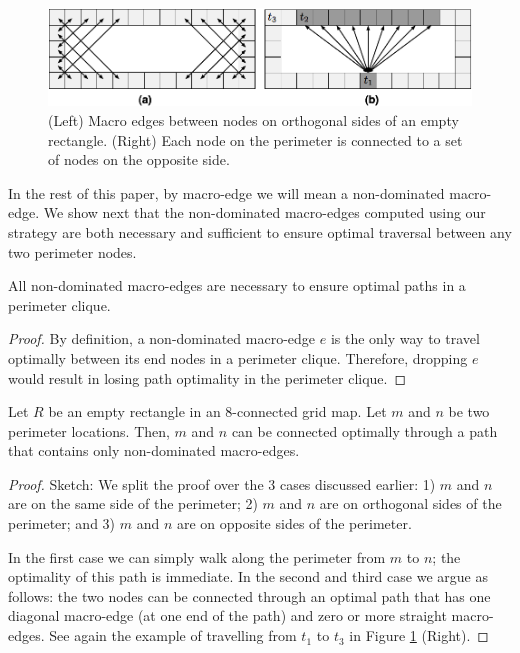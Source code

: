 \begin{figure}[tb]
       \begin{center}
		   \includegraphics[width=0.97\columnwidth, trim = 10mm 10mm 10mm 0mm]
			{diagrams/macroedges_wide.png}
       \end{center}
	\vspace{-3pt}
       \caption{(Left) Macro edges between nodes on orthogonal sides of an empty
       rectangle. (Right) Each node on the perimeter is connected to a set of 
		nodes on the opposite side.}
       \label{fig-macroedges}
\end{figure}

In the rest of this paper, by macro-edge we will mean a non-dominated macro-edge.
We show next that the non-dominated macro-edges computed using our strategy are both
necessary and sufficient to ensure optimal traversal between any two perimeter
nodes.

\begin{proposition} All non-dominated macro-edges are necessary to ensure
optimal paths in a perimeter clique.  
\end{proposition} 
\begin{proof} By
definition, a non-dominated macro-edge $e$ is the only way to travel optimally
between its end nodes in a perimeter clique. Therefore, dropping $e$ would
result in losing path optimality in the perimeter clique.  
\end{proof}

\begin{lemma} \label{lemma-rooms} Let $R$ be an empty rectangle in
an 8-connected grid map. Let $m$ and $n$ be two perimeter locations.
Then, $m$ and $n$ can be connected optimally through a path that
contains only non-dominated macro-edges.
\end{lemma}

\begin{proof}Sketch:
We split the proof over the 3 cases discussed earlier: 1) {$m$ and $n$ are on
the same side of the perimeter;} 2) {\label{lemma-rooms-step2}$m$ and $n$ are on
orthogonal sides of the perimeter;} and 3) {\label{lemma-rooms-step3} $m$ and
$n$ are on opposite sides of the perimeter.}

In the first case we can simply walk along the perimeter from $m$ to $n$; the
optimality of this path is immediate. In the second and third case we argue as
follows:
the two nodes can be connected through an optimal path that has one diagonal macro-edge
(at one end of the path) and zero or more straight macro-edges.
See again the example of travelling from $t_1$ to $t_3$ in Figure
\ref{fig-macroedges} (Right).
\end{proof}

